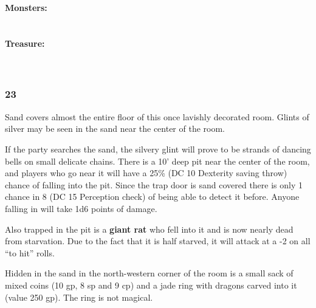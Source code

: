 \documentclass[palace_of_the_silver_princess]{subfiles}
\begin{document}
\textbf{Monsters:}
\\
\\
\\
\textbf{Treasure:}
\\
\\
\\

\subsubsection{23}
\begin{quotebox}
    Sand covers almost the entire floor of this once lavishly decorated
    room. Glints of silver may be seen in the sand near the center of
    the room.
\end{quotebox}

If the party searches the sand, the silvery glint will prove to be
strands of dancing bells on small delicate chains. There is a 10’ deep
pit near the center of the room, and players who go near it will have a
25\% (DC 10 Dexterity saving throw) chance of falling into the pit.
Since the trap door is sand covered there is only 1 chance in 8 (DC 15
Perception check) of being able to detect it before. Anyone falling in
will take 1d6 points of damage.

Also trapped in the pit is a \textbf{giant rat} who fell into it and is now
nearly dead from starvation. Due to the fact that it is half starved,
it will attack at a -2 on all “to hit” rolls.

Hidden in the sand in the north-western corner of the room is a small
sack of mixed coins (10 gp, 8 sp and 9 cp) and a jade ring with dragons
carved into it (value 250 gp). The ring is not magical.
\end{document}
